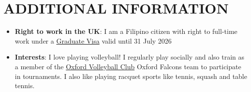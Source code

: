 \documentclass[legalpaper,11pt]{article}
\newcommand{\resumeItem}[2]{
  \item\small{
    \textbf{#1}{: #2 \vspace{-2pt}}
  }
}
\newcommand{\resumeSubItem}[2]{\resumeItem{#1}{#2}\vspace{-4pt}}
\newcommand{\resumeSubHeadingListStart}{\begin{itemize}[leftmargin=*]}
\newcommand{\resumeSubHeadingListEnd}{\end{itemize}}
\begin{document}
\section{ADDITIONAL INFORMATION}
  \resumeSubHeadingListStart
    \resumeSubItem{Right to work in the UK}{I am a Filipino citizen with right to full-time work under a \href{https://www.gov.uk/graduate-visa}{Graduate Visa} valid until 31 July 2026}
    \resumeSubItem{Interests}
    {I love playing volleyball! I regularly play socially and also train as a member of the \href{http://www.oxfordvolleyball.co.uk}{Oxford Volleyball Club} Oxford Falcons team to participate in tournaments. I also like playing racquet sports like tennis, squash and table tennis.}
  \resumeSubHeadingListEnd
\end{document}
